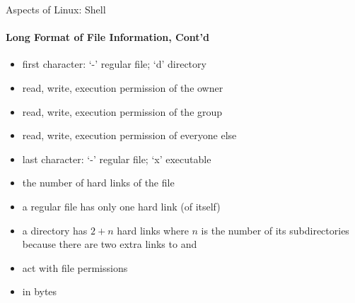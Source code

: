 \begin{frame}{Aspects of Linux: Shell}
\framesubtitle{Long Format of File Information, Cont'd}
	\begin{description}
		\item[File permission]
		\begin{itemize}
			\small
			\item first character: `-’ regular file; `d’ directory 
			\item read, write, execution permission of the owner 
			\item read, write, execution permission of the group 
			\item read, write, execution permission of everyone else
			\item last character: `-’ regular file; `x’ executable 
		\end{itemize}
		\item[Link]
		\begin{itemize}
			\small
			\item the number of hard links of the file
			\item a regular file has only one hard link (of itself)
			\item a directory has $2+n$ hard links where $n$ is the number of its subdirectories because there are two extra links to  and 
		\end{itemize}
		\item[Owner/Group]
		\begin{itemize}
			\small
			\item act with file permissions
		\end{itemize}
		\item[File Size] 
		\begin{itemize}
			\small
			\item in bytes
		\end{itemize}
	\end{description}

\end{frame}


